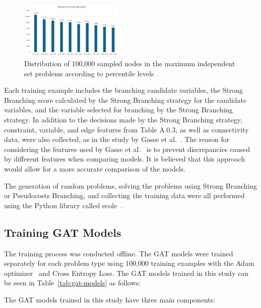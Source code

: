 \begin{figure}[htb!]
    \centering
    \includegraphics[width=0.45\textwidth]{figures/Sample Distribution}
    \caption{Distribution of 100,000 sampled nodes in the maximum independent set problems according to percentile levels}
    \label{fig:sample-distribution}
\end{figure}


Each training example includes the branching candidate variables, the Strong Branching score calculated by the Strong Branching strategy for the candidate variables, and the variable selected for branching by the Strong Branching strategy.
In addition to the decisions made by the Strong Branching strategy, constraint, variable, and edge features from Table A.0.3, %
as well as connectivity data, were also collected, as in the study by Gasse et al.~\cite{gasseExactCombinatorialOptimization2019}.
The reason for considering the features used by Gasse et al.~\cite{gasseExactCombinatorialOptimization2019} is to prevent discrepancies caused by different features when comparing models.
It is believed that this approach would allow for a more accurate comparison of the models.

The generation of random problems, solving the problems using Strong Branching or Pseudocosts Branching, and collecting the training data were all performed using the Python library called ecole~\cite{prouvostEcoleGymlikeLibrary2020a}.


\subsection{Training GAT Models}
The training process was conducted offline.
The GAT models were trained separately for each problem type using 100,000 training examples with the Adam optimizer~\cite{kingmaAdamMethodStochastic2017} and Cross Entropy Loss.
The GAT models trained in this study can be seen in Table~\ref{tab:gat-models} as follows:




The GAT models trained in this study have three main components:

